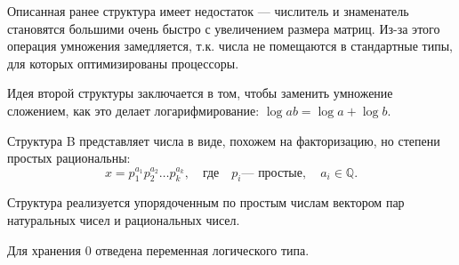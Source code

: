 \documentclass[specialist, substylefile = spbureport.rtx,
               subf,href,colorlinks=true, 12pt]{disser}
\begin{document}
    Описанная ранее структура имеет недостаток --- числитель и знаменатель становятся большими очень быстро с увеличением размера матриц. Из-за этого операция умножения замедляется, т.к. числа не помещаются в стандартные типы, для которых оптимизированы процессоры.

    Идея второй структуры заключается в том, чтобы заменить умножение сложением, как это делает логарифмирование:
    $\log a b = \log a + \log b.$

    Структура B представляет числа в виде, похожем на факторизацию, но степени простых рациональны:
    $$x= p_1^{a_1}p_2^{a_2}\dots p_k^{a_k}, \quad \text{где}\quad p_i \text{--- простые}, \quad a_i \in \mathbb{Q}.$$

    Структура реализуется упорядоченным по простым числам вектором пар натуральных чисел и рациональных чисел. 
    
    Для хранения 0 отведена переменная логического типа.

    
\end{document}
